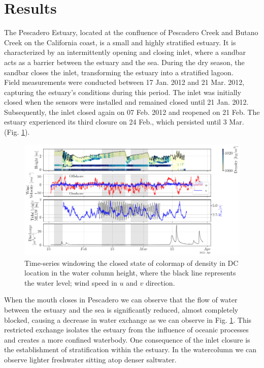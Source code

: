 \documentclass[tesis.tex]{subfiles}
\begin{document}
    
\section{Results}

The Pescadero Estuary, located at the confluence of Pescadero Creek and Butano Creek on the California coast, is a small and highly stratified estuary. It is characterized by an intermittently opening and closing inlet, where a sandbar acts as a barrier between the estuary and the sea. During the dry season, the sandbar closes the inlet, transforming the estuary into a stratified lagoon.\\

Field measurements were conducted between 17 Jan. 2012 and 21 Mar. 2012, capturing the estuary's conditions during this period. The inlet was initially closed when the sensors were installed and remained closed until 21 Jan. 2012. Subsequently, the inlet closed again on 07 Feb. 2012 and reopened on 21 Feb. The estuary experienced its third closure on 24 Feb., which persisted until 3 Mar. (Fig. \ref{fig:results}).\\

\begin{figure}[h!]
  \centering
  \includegraphics[width=\textwidth]{Imagenes/results.png}
  \caption{Time-series windowing the closed state of colormap of density in DC location in the water column height, where the black line represents the water level; wind speed in $u$ and $v$ direction.}
  \label{fig:results}
\end{figure}

 When the mouth closes in Pescadero we can observe that the flow of water between the estuary and the sea is significantly reduced, almost completely blocked, causing a decrease in water exchange as we can observe in Fig. \ref{fig:results}. This restricted exchange isolates the estuary from the influence of oceanic processes and creates a more confined waterbody. One consequence of the inlet closure is the establishment of stratification within the estuary. In the watercolumn we can observe lighter freshwater sitting atop denser saltwater.\\
\end{document}
